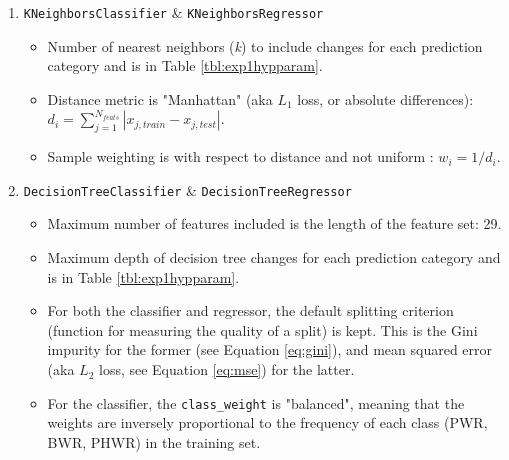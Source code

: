 \begin{enumerate}
  \item \texttt{KNeighborsClassifier} \& \texttt{KNeighborsRegressor}
    \begin{itemize}
      \item Number of nearest neighbors (\textit{k}) to include changes for 
            each prediction category and is in Table \ref{tbl:exp1hypparam}.
      \item Distance metric is "Manhattan" (aka $L_1$ loss, or absolute 
            differences): $d_i = \sum_{j=1}^{N_{feats}} 
            |x_{j,train} - x_{j,test}|$.
      \item Sample weighting is with respect to distance and not uniform : 
            $w_i = 1/d_i$.
    \end{itemize}
  \item \texttt{DecisionTreeClassifier} \& \texttt{DecisionTreeRegressor}
    \begin{itemize}
      \item Maximum number of features included is the length of the feature 
            set: 29.
      \item Maximum depth of decision tree changes for each prediction category
            and is in Table \ref{tbl:exp1hypparam}.
      \item For both the classifier and regressor, the default splitting 
            criterion (function for measuring the quality of a split) is kept.
            This is the Gini impurity for the former (see Equation 
            \ref{eq:gini}), and mean squared error (aka $L_2$ loss, see 
            Equation \ref{eq:mse}) for the latter.
      \item For the classifier, the \texttt{class\_weight} is "balanced", 
            meaning that the weights are inversely proportional to the frequency
            of each class (\gls{PWR}, \gls{BWR}, \gls{PHWR}) in the training set.
    \end{itemize}
\end{enumerate}

